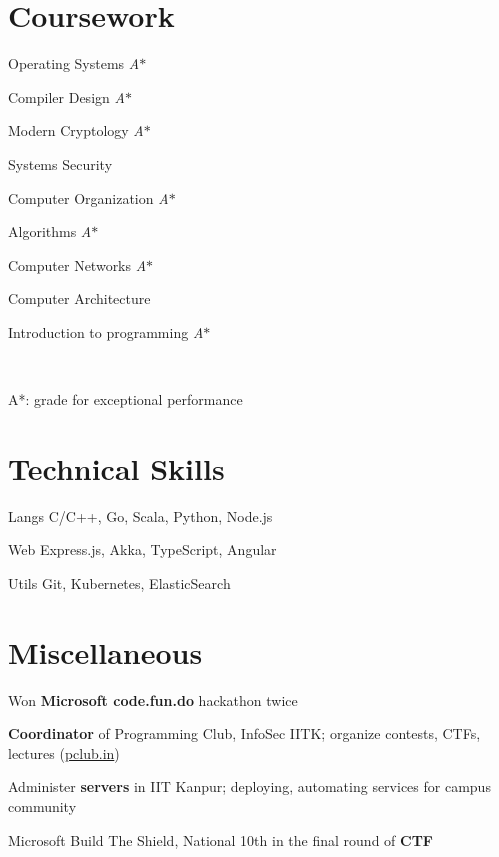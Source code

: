 \documentclass{tccv}
\newcommand{\astar}[0]{\small{\textit{A$*$}}}
\begin{document}
\section{Coursework}
\begin{inlinelist}
\item Operating Systems \astar
\item Compiler Design \astar
\item Modern Cryptology \astar
\item Systems Security
\item Computer Organization \astar
\item Algorithms \astar
\item Computer Networks \astar
\item Computer Architecture
\item Introduction to programming \astar
\end{inlinelist}\\
{\small A*: grade for exceptional performance\par}

\vspace{-0.4cm}
\section{Technical Skills}

\begin{factlist}
\item{\small{Langs}}
  {C/C++, Go, Scala, Python, Node.js}

\item{\small{Web}}
  {Express.js, Akka, TypeScript, Angular}

\item {\small{Utils}}
  {Git, Kubernetes, ElasticSearch}

\end{factlist}

\vspace{-0.3cm}
\section{Miscellaneous}
\vspace{0.2cm}
\begin{thinitemize}
\item Won \textbf{Microsoft code.fun.do} hackathon twice
\item \textbf{Coordinator} of Programming Club, InfoSec IITK; organize
  contests, CTFs, lectures (\href{http://pclub.in}{pclub.in})
\item Administer \textbf{servers} in IIT Kanpur; deploying,
  automating services for campus community
\item Microsoft Build The Shield, National 10th in the final round of
  \textbf{CTF}
\end{thinitemize}
\end{document}

